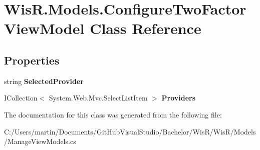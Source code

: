 \hypertarget{class_wis_r_1_1_models_1_1_configure_two_factor_view_model}{}\section{Wis\+R.\+Models.\+Configure\+Two\+Factor\+View\+Model Class Reference}
\label{class_wis_r_1_1_models_1_1_configure_two_factor_view_model}
\subsection*{Properties}
\begin{DoxyCompactItemize}
\item 
\hypertarget{class_wis_r_1_1_models_1_1_configure_two_factor_view_model_a027d8301f94c259a6bb6a3b6318ca353}{}string {\bfseries Selected\+Provider}\label{class_wis_r_1_1_models_1_1_configure_two_factor_view_model_a027d8301f94c259a6bb6a3b6318ca353}

\item 
\hypertarget{class_wis_r_1_1_models_1_1_configure_two_factor_view_model_a5a0e1494800b3460e24b1bd5aca35ca8}{}I\+Collection$<$ System.\+Web.\+Mvc.\+Select\+List\+Item $>$ {\bfseries Providers}\label{class_wis_r_1_1_models_1_1_configure_two_factor_view_model_a5a0e1494800b3460e24b1bd5aca35ca8}

\end{DoxyCompactItemize}


The documentation for this class was generated from the following file\+:\begin{DoxyCompactItemize}
\item 
C\+:/\+Users/martin/\+Documents/\+Git\+Hub\+Visual\+Studio/\+Bachelor/\+Wis\+R/\+Wis\+R/\+Models/Manage\+View\+Models.\+cs\end{DoxyCompactItemize}
